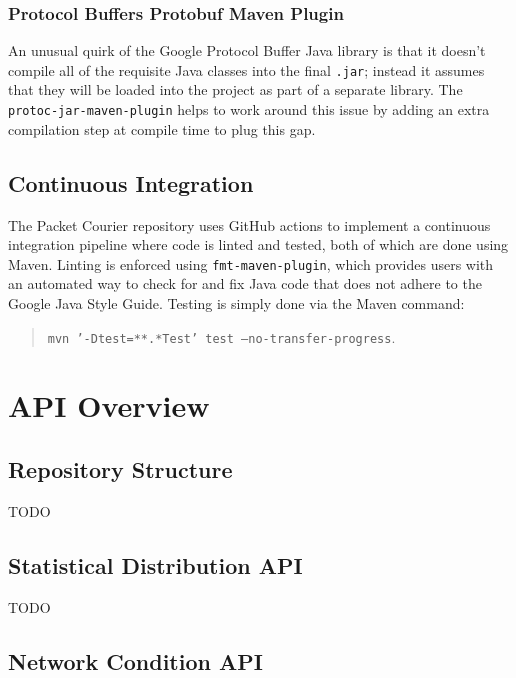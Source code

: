 \subsubsection{Protocol Buffers Protobuf Maven Plugin}

An unusual quirk of the Google Protocol Buffer Java library is that it doesn't compile all of the requisite Java
classes into the final \texttt{.jar}; instead it assumes that they will be loaded into the project as part of a
separate library. The \texttt{protoc-jar-maven-plugin}\cite{protoc_jar_maven_plugin} helps to work around this issue
by adding an extra compilation step at compile time to plug this gap.

\subsection{Continuous Integration}

The Packet Courier repository uses GitHub actions\cite{github_actions} to implement a continuous integration
pipeline\cite{aws_ci} where code is linted and tested, both of which are done using Maven. Linting is enforced using
\texttt{fmt-maven-plugin}\cite{fmt_maven_plugin}, which provides users with an automated way to check for and fix Java
code that does not adhere to the Google Java Style Guide\cite{google_java_format, google_java_style_guide}. Testing
is simply done via the Maven command:
\begin{quote}
    \texttt{mvn '-Dtest=**.*Test' test --no-transfer-progress}.
\end{quote}


\section{API Overview}

\subsection{Repository Structure}

TODO

\subsection{Statistical Distribution API}

TODO

\subsection{Network Condition API}

